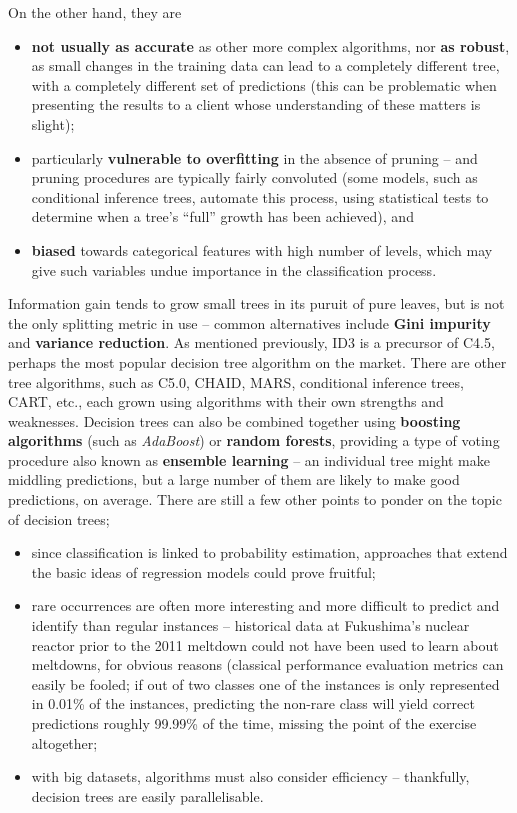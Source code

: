 On the other hand, they are 
\begin{itemize}[noitemsep]
\item \textbf{not usually as accurate} as other more complex algorithms, nor \textbf{as robust}, as small changes in the training data can lead to a completely different tree, with a completely different set of predictions (this can be problematic when presenting the results to a client whose understanding of these matters is slight);
\item particularly \textbf{vulnerable to overfitting} in the absence of pruning -- and pruning procedures are typically fairly convoluted (some models, such as conditional inference trees, automate this process, using statistical tests to determine when a tree's ``full'' growth has been achieved), and
\item \textbf{biased} towards categorical features with high number of levels, which may give such variables undue importance in the classification process.
\end{itemize}
Information gain tends to grow small trees in its puruit of pure leaves, but is not the only splitting metric in use -- common alternatives include \textbf{Gini impurity} and \textbf{variance reduction}. As mentioned previously, ID3 is a precursor of C4.5, perhaps the most popular decision tree algorithm on the market. There are other tree algorithms, such as C5.0, CHAID, MARS, conditional inference trees, CART, etc., each grown using algorithms with their own strengths and weaknesses. \newl Decision trees can also be combined together using \textbf{boosting algorithms} (such as \textit{AdaBoost}) or \textbf{random forests}, providing a type of voting procedure also known as \textbf{ensemble learning} -- an individual tree might make middling predictions, but a large number of them are likely to make good predictions, on average. 
\newl There are still a few other points to ponder on the topic of decision trees;
\begin{itemize}[noitemsep]
\item since classification is linked to probability estimation, approaches that extend the basic ideas of regression models could prove fruitful;
\item rare occurrences are often more interesting and more difficult to predict and identify than regular instances -- historical data at Fukushima's nuclear reactor prior to the 2011 meltdown could not have been used to learn about meltdowns, for obvious reasons (classical performance evaluation metrics can easily be fooled; if out of two classes one of the instances is only represented in 0.01\% of the instances, predicting the non-rare class will yield correct predictions roughly 99.99\% of the time, missing the point of the exercise altogether;
\item with big datasets, algorithms must also consider efficiency -- thankfully, decision trees are easily parallelisable. 
\end{itemize}
